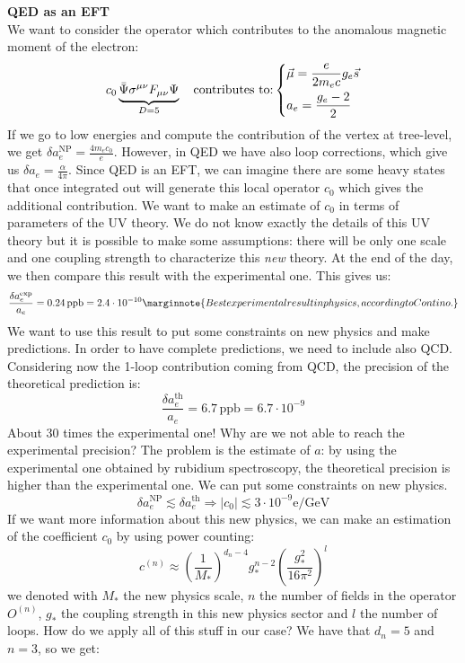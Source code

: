 \documentclass[../main.tex]{subfiles}
\begin{document}
\begin{example}\textbf{QED as an EFT}\\
We want to consider the operator which contributes to the anomalous magnetic moment of the electron:
\[
c_0\underbrace{\Bar{\Psi}\sigma^{\mu\nu}F_{\mu\nu}\Psi}_{D=5}\quad\text{contributes to:}\left\{\begin{aligned}
&\Vec{\mu}=\frac{e}{2m_ec}g_e\Vec{s}\\
&a_e=\frac{g_e-2}{2}
\end{aligned}\right.
\]
If we go to low energies and compute the contribution of the vertex at tree-level, we get $\delta a_e^{\text{NP}}=\frac{4m_ec_0}{e}$. However, in QED we have also loop corrections, which give us $\delta a_e=\frac{\alpha}{4\pi}$. Since QED is an EFT, we can imagine there are some heavy states that once integrated out will generate this local operator $c_0$ which gives the additional contribution. We want to make an estimate of $c_0$ in terms of parameters of the UV theory. We do not know exactly the details of this UV theory but it is possible to make some assumptions: there will be only one scale and one coupling strength to characterize this \textit{new} theory. At the end of the day, we then compare this result with the experimental one. This gives us:
\[
\frac{\delta a_e^{\text{exp}}}{a_e}=0.24\,\text{ppb}=2.4\cdot10^{-10}\marginnote{Best experimental result in physics, according to Contino.}
\]
We want to use this result to put some constraints on new physics and make predictions. In order to have complete predictions, we need to include also QCD. Considering now the 1-loop contribution coming from QCD, the precision of the theoretical prediction is:
\[
\frac{\delta a_e^{\text{th}}}{a_e}=6.7\,\text{ppb}=6.7\cdot10^{-9}
\]
About 30 times the experimental one! Why are we not able to reach the experimental precision? The problem is the estimate of $a$: by using the experimental one obtained by rubidium spectroscopy, the theoretical precision is higher than the experimental one. We can put some constraints on new physics.
\[
\delta a_e^{\text{NP}}\lesssim\delta a_e^{\text{th}}\Rightarrow|c_0|\lesssim3\cdot10^{-9} \text{e/GeV}
\]
If we want more information about this new physics, we can make an estimation of the coefficient $c_0$ by using power counting:
\[
c^{(n)}\approx\left(\frac{1}{M_*}\right)^{d_n-4}g_*^{n-2}\left(\frac{g_*^2}{16\pi^2}\right)^l
\]
we denoted with $M_*$ the new physics scale, $n$ the number of fields in the operator $O^{(n)}$, $g_*$ the coupling strength in this new physics sector and $l$ the number of loops. How do we apply all of this stuff in our case? We have that $d_n=5$ and $n=3$, so we get:

\end{example}
\end{document}
